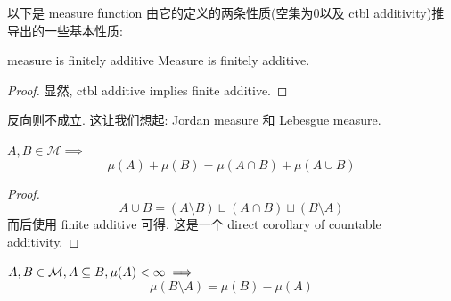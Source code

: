 \noindent 以下是 measure function 由它的定义的两条性质(空集为0以及 ctbl additivity)推导出的一些基本性质:

\begin{lemma}{measure is finitely additive}
    Measure is finitely additive.
\end{lemma}
\begin{proof}
    显然, ctbl additive implies finite additive.
\end{proof}

\begin{remark}
    反向则不成立. 这让我们想起: Jordan measure 和 Lebesgue measure. 
\end{remark}

\begin{lemma}
    $A,B\in \mathcal{M} \implies$
    $$
    \mu(A) + \mu(B) = \mu(A \cap B) + \mu(A \cup B)
    $$
\end{lemma}
\begin{proof}
    $$A \cup B = (A \setminus B) \sqcup (A\cap B) \sqcup (B\setminus A)$$
    而后使用 finite additive 可得. 这是一个 direct corollary of countable additivity.
\end{proof}

\begin{corollary}
    $A,B\in \mathcal{M}, A\subseteq B, \mu(A) < \infty \implies$
    $$
    \mu(B\setminus A) = \mu(B) - \mu(A)
    $$
\end{corollary}




